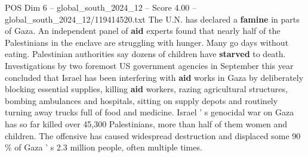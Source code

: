 \begin{textsample}{POS Dim 6 – global\_south\_2024\_12 – Score 4.00 – global\_south\_2024\_12/119414520.txt}
The U.N. has declared a \textbf{famine} in parts of Gaza.
An independent panel of \textbf{aid} experts found that nearly half of the Palestinians in the enclave are struggling with hunger.
Many go days without eating.
Palestinian authorities say dozens of children have \textbf{starved} to death.
Investigations by two foremost US government agencies in September this year concluded that Israel has been interfering with \textbf{aid} works in Gaza by deliberately blocking essential supplies, killing \textbf{aid} workers, razing agricultural structures, bombing ambulances and hospitals, sitting on supply depots and routinely turning away trucks full of food and medicine.
Israel ' s genocidal war on Gaza has so far killed over 45,300 Palestinians, more than half of them women and children.
The offensive has caused widespread destruction and displaced some 90 \% of Gaza ' s 2.3 million people, often multiple times.

\end{textsample}
